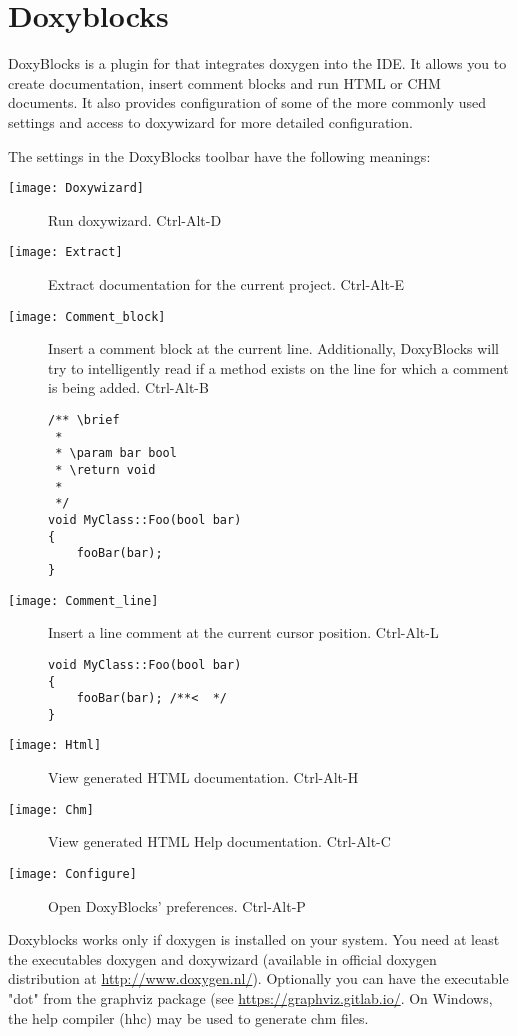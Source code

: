 \section{Doxyblocks}\label{sec:doxyblocks}

DoxyBlocks is a plugin for \codeblocks that integrates doxygen into the IDE. It allows you to create documentation, insert comment blocks and run HTML or CHM documents. It also provides configuration of some of the more commonly used settings and access to doxywizard for more detailed configuration.

The settings in the DoxyBlocks toolbar have the following meanings:

\begin{description}
\item[\texttt{[image: Doxywizard]}] Run doxywizard. Ctrl-Alt-D
\item[\texttt{[image: Extract]}] Extract documentation for the current project. Ctrl-Alt-E
\item[\texttt{[image: Comment\_block]}] Insert a comment block at the current line. Additionally, DoxyBlocks will try to intelligently read if a method exists on the line for which a comment is being added. Ctrl-Alt-B

\begin{lstlisting}
/** \brief
 *
 * \param bar bool
 * \return void
 *
 */    
void MyClass::Foo(bool bar)
{
    fooBar(bar);
}
\end{lstlisting}

\item[\texttt{[image: Comment\_line]}] Insert a line comment at the current cursor position. Ctrl-Alt-L
\begin{lstlisting}
void MyClass::Foo(bool bar)
{
    fooBar(bar); /**<  */
}
\end{lstlisting}

\item[\texttt{[image: Html]}] View generated HTML documentation. Ctrl-Alt-H
\item[\texttt{[image: Chm]}] View generated HTML Help documentation. Ctrl-Alt-C
\item[\texttt{[image: Configure]}] Open DoxyBlocks' preferences. Ctrl-Alt-P
\end{description}

Doxyblocks works only if doxygen is installed on your system. You need at least the executables doxygen and doxywizard (available in official doxygen distribution at \url{http://www.doxygen.nl/}). Optionally you can have the executable "dot" from the graphviz package (see \url{https://graphviz.gitlab.io/}. On Windows, the help compiler (hhc) may be used to generate chm files.

